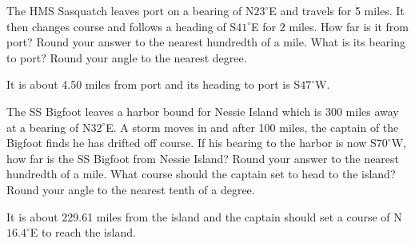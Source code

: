 \documentclass{ximera}
\begin{document}
\begin{problem}
The HMS Sasquatch leaves port on a bearing of N$23^{\circ}$E and travels for 5 miles.  It then changes course and follows a heading of S$41^{\circ}$E for 2 miles.  How far is it from port? Round your answer to the nearest hundredth of a mile. What is its bearing to port?  Round your angle to the nearest degree.

\begin{solution}
It is about 4.50 miles from port and its heading to port is S$47^{\circ}$W.
\end{solution}
\end{problem}

\begin{problem}
The SS Bigfoot leaves a harbor bound for Nessie Island which is 300 miles away at a bearing of N$32^{\circ}$E.  A storm moves in and after 100 miles, the captain of the Bigfoot finds he has drifted off course.  If his bearing to the harbor is now S$70^{\circ}$W, how far is the SS Bigfoot from Nessie Island?  Round your answer to the nearest hundredth of a mile.  What course should the captain set to head to the island?  Round your angle to the nearest tenth of a degree.

\begin{solution}
It is about 229.61 miles from the island and the captain should set a course of N$16.4^{\circ}$E to reach the island.
\end{solution}
\end{problem}
\end{document}
